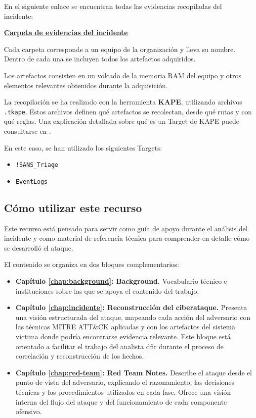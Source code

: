 En el siguiente enlace se encuentran todas las evidencias recopiladas del incidente:

\begin{center}
\href{https://drive.google.com/drive/folders/18eekh9kx51psuuTZ_nHl3NHEQLJb7zRV?usp=drive_link}{\textbf{Carpeta de evidencias del incidente}}
\end{center}

Cada carpeta corresponde a un equipo de la organización y lleva su nombre. Dentro de cada una se incluyen todos los artefactos adquiridos.

Los artefactos consisten en un volcado de la memoria RAM del equipo y otros elementos relevantes obtenidos durante la adquisición.

La recopilación se ha realizado con la herramienta \textbf{KAPE}, utilizando archivos \texttt{.tkape}. Estos archivos definen qué artefactos se recolectan, desde qué rutas y con qué reglas. Una explicación detallada sobre qué es un Target de KAPE puede consultarse en \cite{kape-targets}.

En este caso, se han utilizado los siguientes Targets:

\begin{itemize}
    \item \texttt{\string!SANS\_Triage} \cite{sans_triage_kape}
    \item \texttt{EventLogs} \cite{eventlogs_kape}
\end{itemize}

\subsection{Cómo utilizar este recurso}

Este recurso está pensado para servir como guía de apoyo durante el análisis del incidente y como material de referencia técnica para comprender en detalle cómo se desarrolló el ataque.

El contenido se organiza en dos bloques complementarios:

\begin{itemize}
    \item \textbf{Capítulo \ref{chap:background}: Background.}  
    Vocabulario técnico e instituciones sobre las que se apoya el contenido del trabajo.

    \item \textbf{Capítulo \ref{chap:incidente}: Reconstrucción del ciberataque.}  
    Presenta una visión estructurada del ataque, mapeando cada acción del adversario con las técnicas MITRE ATT\&CK aplicadas y con los artefactos del sistema víctima donde podría encontrarse evidencia relevante. Este bloque está orientado a facilitar el trabajo del analista \acrshort{dfir} durante el proceso de correlación y reconstrucción de los hechos.

    \item \textbf{Capítulo \ref{chap:red-team}: Red Team Notes.}  
    Describe el ataque desde el punto de vista del adversario, explicando el razonamiento, las decisiones técnicas y los procedimientos utilizados en cada fase. Ofrece una visión interna del flujo del ataque y del funcionamiento de cada componente ofensivo.
\end{itemize}

